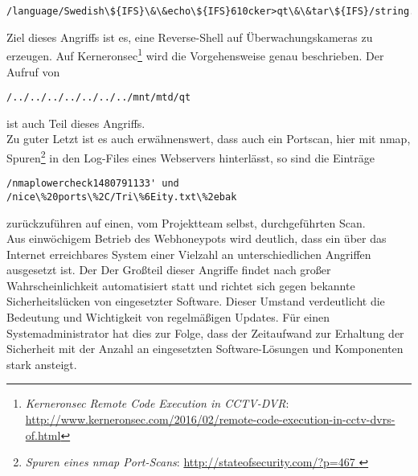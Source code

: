 \begin{lstlisting}[style=customc]
/language/Swedish\${IFS}\&\&echo\${IFS}610cker>qt\&\&tar\${IFS}/string.js
\end{lstlisting}

Ziel dieses Angriffs ist es, eine Reverse-Shell auf Überwachungskameras zu erzeugen. Auf Kerneronsec\footnote{ \textit{Kerneronsec Remote Code Execution in CCTV-DVR}: \url{http://www.kerneronsec.com/2016/02/remote-code-execution-in-cctv-dvrs-of.html}} wird die Vorgehensweise genau beschrieben. Der Aufruf von 

\begin{lstlisting}[style=customc]
/../../../../../../../mnt/mtd/qt
\end{lstlisting}
 ist auch Teil dieses Angriffs.\\

Zu guter Letzt ist es auch erwähnenswert, dass auch ein Portscan, hier mit nmap, Spuren\footnote{ \textit{Spuren eines nmap Port-Scans}: \url{http://stateofsecurity.com/?p=467 }} in den Log-Files eines Webservers hinterlässt, so sind die Einträge

\begin{lstlisting}[style=customc]
/nmaplowercheck1480791133' und /nice\%20ports\%2C/Tri\%6Eity.txt\%2ebak
\end{lstlisting}

zurückzuführen auf einen, vom Projektteam selbst, durchgeführten Scan.\\

Aus einwöchigem Betrieb des Webhoneypots wird deutlich, dass ein über das Internet erreichbares System einer Vielzahl an unterschiedlichen Angriffen ausgesetzt ist. Der Der Großteil dieser Angriffe findet nach großer Wahrscheinlichkeit automatisiert statt und richtet sich gegen bekannte Sicherheitslücken von eingesetzter Software. Dieser Umstand verdeutlicht die Bedeutung und Wichtigkeit von regelmäßigen Updates. Für einen Systemadministrator hat dies zur Folge, dass der Zeitaufwand zur Erhaltung der Sicherheit mit der Anzahl an eingesetzten Software-Lösungen und Komponenten stark ansteigt.